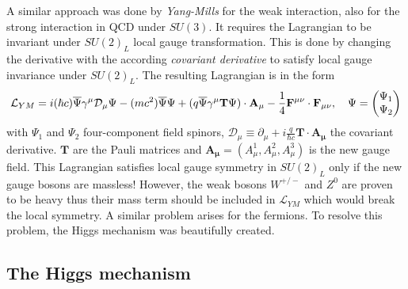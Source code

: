 A similar approach was done by \textit{Yang-Mills} for the weak interaction, also for the strong interaction in QCD under $SU(3)$. It requires the Lagrangian to be invariant under $SU(2)_{L}$ local gauge transformation. This is done by changing the derivative with the according \textit{covariant derivative} to satisfy local gauge invariance under $SU(2)_{L}$. The resulting Lagrangian is in the form \cite{Griffiths:343277}
\begin{equation}
  \mathcal{L}_{YM} = i(\hbar c)\overline{\rm \Psi}\gamma^{\mu}\mathcal{D}_{\mu}\Psi - (mc^2)\overline{\rm \Psi}\Psi + (q\overline{\rm \Psi}\gamma^{\mu}\mathbf{T}\Psi) \cdot \mathbf{A_{\mu}} - \frac{1}{4}\mathbf{F^{\mu\nu}} \cdot \mathbf{F_{\mu\nu}}, \quad \Psi = \begin{pmatrix} \Psi_1 \\ \Psi_2 \end{pmatrix}
\end{equation}
with $\Psi_1$ and $\Psi_2$ four-component field spinors, $\mathcal{D}_{\mu} \equiv \partial_{\mu} + i\frac{q}{\hbar c}\mathbf{T} \cdot \mathbf{A_{\mu}}$ the covariant derivative. $\mathbf{T}$ are the Pauli matrices and $\mathbf{A_{\mu}} = (A_{\mu}^1, A_{\mu}^2, A_{\mu}^3)$ is the new gauge field. This Lagrangian satisfies local gauge symmetry in $SU(2)_{L}$ only if the new gauge bosons are massless! However, the weak bosons $W^{+/-}$ and $Z^0$ are proven to be heavy thus their mass term should be included in $\mathcal{L}_{YM}$ which would break the local symmetry. A similar problem arises for the fermions. To resolve this problem, the Higgs mechanism was beautifully created.

\subsection{The Higgs mechanism}
\label{subsec:HiggsMecha}

